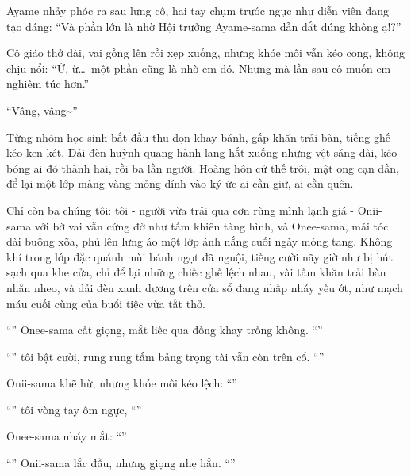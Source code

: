 \documentclass[../main.tex]{subfiles}
\begin{document}
Ayame nhảy phóc ra sau lưng cô, hai tay chụm trước ngực như diễn viên đang tạo dáng: ``Và phần lớn là nhờ Hội trưởng Ayame-sama dẫn dắt đúng không ạ!?''

Cô giáo thở dài, vai gồng lên rồi xẹp xuống, nhưng khóe môi vẫn kéo cong, không chịu nổi: ``Ừ, ừ\dots\ một phần cũng là nhờ em đó. Nhưng mà lần sau cô muốn em nghiêm túc hơn.''

``Vâng, vâng\~{}''

Từng nhóm học sinh bắt đầu thu dọn khay bánh, gấp khăn trải bàn, tiếng ghế kéo ken két. Dải đèn huỳnh quang hành lang hắt xuống những vệt sáng dài, kéo bóng ai đó thành hai, rồi ba lần người. Hoàng hôn cứ thế trôi, mật ong cạn dần, để lại một lớp màng vàng mỏng dính vào ký ức ai cần giữ, ai cần quên.

\ct

Chỉ còn ba chúng tôi: tôi - người vừa trải qua cơn rùng mình lạnh giá - Onii-sama với bờ vai vẫn cứng đờ như tấm khiên tàng hình, và Onee-sama, mái tóc dài buông xõa, phủ lên lưng áo một lớp ánh nắng cuối ngày mỏng tang. Không khí trong lớp đặc quánh mùi bánh ngọt đã nguội, tiếng cười nãy giờ như bị hút sạch qua khe cửa, chỉ để lại những chiếc ghế lệch nhau, vài tấm khăn trải bàn nhăn nheo, và dải đèn xanh dương trên cửa sổ đang nhấp nháy yếu ớt, như mạch máu cuối cùng của buổi tiệc vừa tắt thở.

``'' Onee-sama cất giọng, mắt liếc qua đống khay trống không. ``''

``'' tôi bật cười, rung rung tấm bảng trọng tài vẫn còn trên cổ. ``''

Onii-sama khẽ hừ, nhưng khóe môi kéo lệch: ``''

``'' tôi vòng tay ôm ngực, ``''

Onee-sama nháy mắt: ``''

``'' Onii-sama lắc đầu, nhưng giọng nhẹ hẳn. ``''
\end{document}
